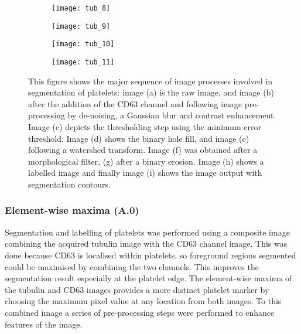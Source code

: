 \begin{figure}[htbp]
	\begin{subfigure}[b]{0.32\linewidth}
		\centering
		\texttt{[image: tub\_8]}
		\caption{}
		\label{figure:image_processing:platelet:tub_8}
		\vspace{1ex}
	\end{subfigure}
	\begin{subfigure}[b]{0.32\linewidth}
		\centering
		\texttt{[image: tub\_9]}
		\caption{}
		\label{figure:image_processing:platelet:tub_9}
		\vspace{1ex}
	\end{subfigure}
	\begin{subfigure}[b]{0.32\linewidth}
		\centering
		\texttt{[image: tub\_10]}
		\caption{}
		\label{figure:image_processing:platelet:tub_10}
		\vspace{1ex}
	\end{subfigure}
	\begin{subfigure}[b]{0.32\linewidth}
		\texttt{[image: tub\_11]}
		\caption{}
		\label{figure:image_processing:platelet:tub_11}
		\vspace{1ex}
	\end{subfigure}
\caption[Image processing for platelet segmentation]{This figure shows the  major sequence of image processes involved in segmentation of platelets: image (a) is the raw image, and image (b) after the addition of the CD63 channel and following image pre-processing by de-noising, a Gaussian blur and contrast enhancement. Image (c) depicts the thresholding step using the minimum error threshold. Image (d) shows the binary hole fill, and image (e) following a watershed transform. Image (f) was obtained after a morphological filter, (g) after a binary erosion. Image (h) shows a labelled image and finally image (i) shows the image output with segmentation contours.}
\label{figure:image_processing:platelets}
\end{figure}

\subsubsection{Element-wise maxima (A.0)}
Segmentation and labelling of platelets was performed using a composite image combining the acquired tubulin image with the CD63 channel image. This was done because CD63 is localised within platelets, so foreground regions segmented could be maximised by combining the two channels. This improves the segmentation result especially at the platelet edge. The element-wise maxima of the tubulin and CD63 images provides a more distinct platelet marker by choosing the maximum pixel value at any location from both images. To this combined image a series of pre-processing steps were performed to enhance features of the image.

